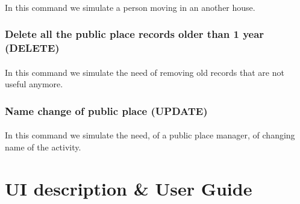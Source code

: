 \documentclass[a4paper,12pt]{article}
\begin{document}
\paragraph{} In this command we simulate a person moving in an another house.
\begin{center}
\end{center}

\subsubsection{Delete all the public place records older than 1 year (DELETE) }
\paragraph{} In this command we simulate the need of removing old records that are not useful anymore.
\begin{center}
\end{center}

\subsubsection{Name change of public place (UPDATE)}
\paragraph{} In this command we simulate the need, of a public place manager, of changing name of the activity.
\begin{center}
\end{center}
\clearpage
\section{UI description \& User Guide}
\end{document}
